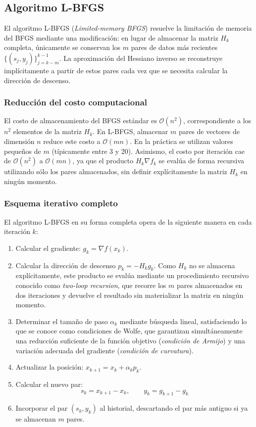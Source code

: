 \subsection{Algoritmo L-BFGS}

El algoritmo L-BFGS (\textit{Limited-memory BFGS}) resuelve la limitación de memoria del BFGS mediante una modificación: en lugar de almacenar la matriz \(H_k\) completa, únicamente se conservan los \(m\) pares de datos más recientes \(\{(s_j, y_j)\}_{j=k-m}^{k-1}\). La aproximación del Hessiano inverso se reconstruye implícitamente a partir de estos pares cada vez que se necesita calcular la dirección de descenso.

\subsubsection*{Reducción del costo computacional}

El costo de almacenamiento del BFGS estándar es \(\mathcal{O}(n^2)\), correspondiente a los \(n^2\) elementos de la matriz \(H_k\). En L-BFGS, almacenar \(m\) pares de vectores de dimensión \(n\) reduce este costo a \(\mathcal{O}(mn)\). En la práctica se utilizan valores pequeños de \(m\) (típicamente entre 3 y 20). Asimismo, el costo por iteración cae de \(\mathcal{O}(n^2)\) a \(\mathcal{O}(mn)\), ya que el producto \(H_k \nabla f_k\) se evalúa de forma recursiva utilizando sólo los pares almacenados, sin definir explícitamente la matriz \(H_k\) en ningún momento.

\subsubsection*{Esquema iterativo completo}

El algoritmo L-BFGS en su forma completa opera de la siguiente manera en cada iteración \(k\):

\begin{enumerate}
    \item Calcular el gradiente: \( g_k = \nabla f(x_k) \).
    \item Calcular la dirección de descenso \(p_k = -H_k g_k\). Como \(H_k\) no se almacena explícitamente, este producto se evalúa mediante un procedimiento recursivo conocido como \textit{two-loop recursion}, que recorre los \(m\) pares almacenados en dos iteraciones y devuelve el resultado sin materializar la matriz en ningún momento.
    \item Determinar el tamaño de paso \(\alpha_k\) mediante búsqueda lineal, satisfaciendo lo que se conoce como condiciones de Wolfe, que garantizan simultáneamente una reducción suficiente de la función objetivo (\textit{condición de Armijo}) y una variación adecuada del gradiente (\textit{condición de curvatura}).
    \item Actualizar la posición: \( x_{k+1} = x_k + \alpha_k p_k \).
    \item Calcular el nuevo par:
    \[
    s_k = x_{k+1} - x_k, \qquad y_k = g_{k+1} - g_k
    \]
    \item Incorporar el par \((s_k, y_k)\) al historial, descartando el par más antiguo si ya se almacenan \(m\) pares.
\end{enumerate}

